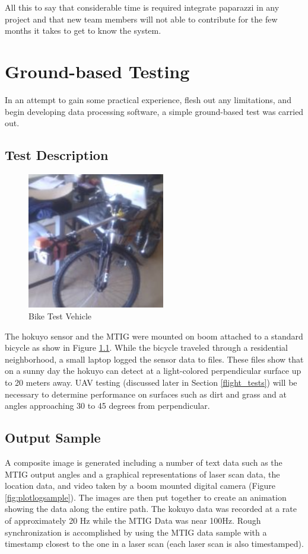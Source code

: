 \documentclass[a4paper,11pt]{report}
\begin{document}
All this to say that considerable time is required integrate paparazzi in any project and that new team members will not able to contribute for the few months it takes to get to know the system.

\chapter{Ground-based Testing}

In an attempt to gain some practical experience, flesh out any limitations, and begin developing data processing software, a simple ground-based test was carried out.

\section{Test Description}

\begin{figure}[ht]
 \centering
 \includegraphics[width=6cm]{./Bikesciencepackage.jpg}
 \caption{Bike Test Vehicle}
 \label{fig:bike}
\end{figure}

The hokuyo sensor and the MTIG were mounted on boom attached to a standard bicycle as show in Figure \ref{fig:bike}. While the bicycle traveled through a residential neighborhood, a small laptop logged the sensor data to files. These files show that on a sunny day the hokuyo can detect at a light-colored perpendicular surface up to 20 meters away. UAV testing (discussed later in Section \ref{flight_tests}) will be necessary to determine performance on surfaces such as dirt and grass and at angles approaching 30 to 45 degrees from perpendicular.

\section{Output Sample}

A composite image is generated including a number of text data such as the MTIG output angles and a graphical representations of laser scan data, the location data, and video taken by a boom mounted digital camera (Figure \ref{fig:plotlogsample}). The images are then put together to create an animation showing the data along the entire path. The kokuyo data was recorded at a rate of approximately 20 Hz while the MTIG Data was near 100Hz. Rough synchronization is accomplished by using the MTIG data sample with a timestamp closest to the one in a laser scan (each laser scan is also timestamped). 
\end{document}
